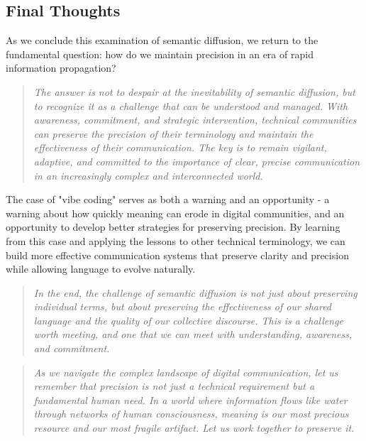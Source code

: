 \documentclass[11pt]{article}
\begin{document}
\subsection{Final Thoughts}

As we conclude this examination of semantic diffusion, we return to the fundamental question: how do we maintain precision in an era of rapid information propagation?

\begin{quote}
\emph{The answer is not to despair at the inevitability of semantic diffusion, but to recognize it as a challenge that can be understood and managed. With awareness, commitment, and strategic intervention, technical communities can preserve the precision of their terminology and maintain the effectiveness of their communication. The key is to remain vigilant, adaptive, and committed to the importance of clear, precise communication in an increasingly complex and interconnected world.}
\end{quote}

The case of "vibe coding" serves as both a warning and an opportunity - a warning about how quickly meaning can erode in digital communities, and an opportunity to develop better strategies for preserving precision. By learning from this case and applying the lessons to other technical terminology, we can build more effective communication systems that preserve clarity and precision while allowing language to evolve naturally.

\begin{quote}
\emph{In the end, the challenge of semantic diffusion is not just about preserving individual terms, but about preserving the effectiveness of our shared language and the quality of our collective discourse. This is a challenge worth meeting, and one that we can meet with understanding, awareness, and commitment.}
\end{quote}

\vfill

\begin{quote}
\emph{As we navigate the complex landscape of digital communication, let us remember that precision is not just a technical requirement but a fundamental human need. In a world where information flows like water through networks of human consciousness, meaning is our most precious resource and our most fragile artifact. Let us work together to preserve it.}
\end{quote}
\end{document}
